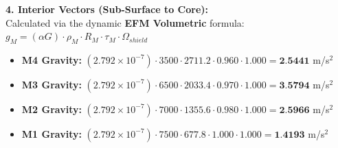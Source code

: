 \documentclass[11pt, a4paper]{article}
\begin{document}
  \vspace{0.5em}
  \noindent \textbf{4. Interior Vectors (Sub-Surface to Core):} \\[0.5em]
  \hspace*{1em} Calculated via the dynamic \textbf{EFM Volumetric} formula: $g_M = (\alpha G) \cdot \rho_{M} \cdot R_M \cdot \tau_M \cdot \Omega_{shield}$
  \begin{itemize}
    \item \textbf{M4 Gravity:} $(2.792 \times 10^{-7}) \cdot 3500 \cdot 2711.2 \cdot 0.960 \cdot 1.000 = \textbf{2.5441}$ m/s$^2$
    \item \textbf{M3 Gravity:} $(2.792 \times 10^{-7}) \cdot 6500 \cdot 2033.4 \cdot 0.970 \cdot 1.000 = \textbf{3.5794}$ m/s$^2$
    \item \textbf{M2 Gravity:} $(2.792 \times 10^{-7}) \cdot 7000 \cdot 1355.6 \cdot 0.980 \cdot 1.000 = \textbf{2.5966}$ m/s$^2$
    \item \textbf{M1 Gravity:} $(2.792 \times 10^{-7}) \cdot 7500 \cdot 677.8 \cdot 1.000 \cdot 1.000 = \textbf{1.4193}$ m/s$^2$
  \end{itemize}
\end{document}
